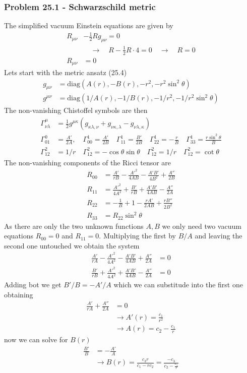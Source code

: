 \documentclass[10pt,a4paper]{article}
\theoremstyle{definition}
\begin{document}
\subsubsection{Problem 25.1 - Schwarzschild metric}
The simplified vacuum Einstein equations are given by
\begin{align}
R_{\mu\nu}&-\frac{1}{2}Rg_{\mu\nu}=0\\
&\quad\rightarrow\quad R-\frac{1}{2}R\cdot 4=0\quad\rightarrow\quad R=0\\
R_{\mu\nu}&=0
\end{align}
Lets start with the metric ansatz (25.4) 
\begin{align}
g_{\mu\nu}&=\text{diag}(A(r),-B(r),-r^2,-r^2\sin^2\theta)\\
g^{\mu\nu}&=\text{diag}(1/A(r),-1/B(r),-1/r^2,-1/r^2\sin^2\theta)
\end{align}
The non-vanishing Chistoffel symbols are then
\begin{align}
\Gamma^\mu_{\nu\lambda}&=\frac{1}{2}g^{\mu\kappa}(g_{\kappa\lambda,\nu}+g_{\nu\kappa,\lambda}-g_{\nu\lambda,\kappa})\\
\Gamma^0_{01}&=\frac{A'}{2A},\quad
\Gamma^1_{00}=\frac{A'}{2B}\quad
\Gamma^1_{11}=\frac{B'}{2B}\quad
\Gamma^1_{22}=-\frac{r}{B}\quad
\Gamma^1_{33}=\frac{r\sin^2\theta}{B}\\
\Gamma^2_{12}&=1/r\quad
\Gamma^2_{12}=-\cos\theta\sin\theta\quad
\Gamma^2_{12}=1/r\quad
\Gamma^2_{12}=\cot\theta
\end{align}
The non-vanishing components of the Ricci tensor are
\begin{align}
R_{00}&=\frac{A'}{rB}-\frac{A'^2}{4AB}-\frac{A'B'}{4B^2}+\frac{A''}{2B}\\
R_{11}&=\frac{A'^2}{4A^2}+\frac{B'}{rB}+\frac{A'B'}{4AB}-\frac{A''}{2A}\\
R_{22}&=-\frac{1}{B}+1-\frac{rA'}{2AB}+\frac{rB''}{2B^2}\\
R_{33}&=R_{22}\sin^2\theta
\end{align}
As there are only the two unknown functions $A, B$ we only need two vacuum equations $R_{00}=0$ and $R_{11}=0$. Multiplying the first by $B/A$ and leaving the second  one untouched we obtain the system
\begin{align}
\frac{A'}{rA}-\frac{A'^2}{4A^2}-\frac{A'B'}{4AB}+\frac{A''}{2A}&=0\\
\frac{B'}{rB}+\frac{A'^2}{4A^2}+\frac{A'B'}{4AB}-\frac{A''}{2A}&=0
\end{align}
Adding bot we get $B'/B=-A'/A$ which we can substitude into the first one obtaining
\begin{align}
\frac{A'}{rA}+\frac{A''}{2A}&=0\\
&\rightarrow A'(r)=\frac{c_1}{r^2}\\
&\rightarrow A(r)=c_2-\frac{c_1}{r}
\end{align}
now we can solve for $B(r)$
\begin{align}
\frac{B'}{B}&=-\frac{A'}{A}\\
&\rightarrow B(r)=\frac{c_3 r}{c_1-rc_2}=\frac{-c_3}{c_2-\frac{c_1}{r}}
\end{align}
\end{document}
